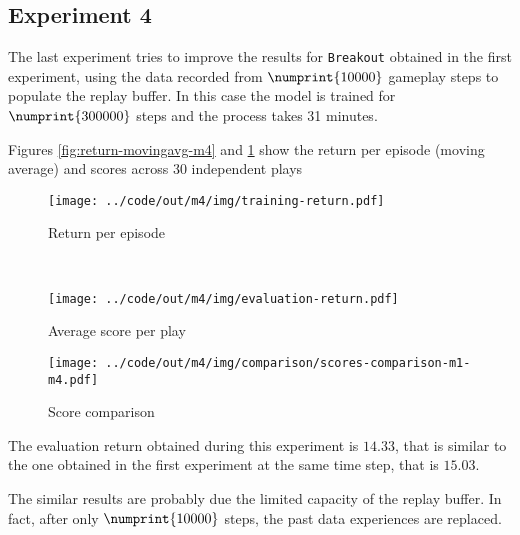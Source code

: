 \documentclass[a4paper,12pt]{article} %
\begin{document}
%	

	
	\subsection*{Experiment 4}
	The last experiment tries to improve the results for \texttt{Breakout} obtained in the first experiment, using the data recorded from $\numprint{10000}$ gameplay steps to populate the replay buffer.
	In this case the model is trained for $\numprint{300000}$ steps and the process takes 31 minutes.
	\bigskip

	Figures \ref{fig:return-movingavg-m4} and \ref{fig:score-m4} show the return per episode (moving average) and scores across 30 independent plays
	
	\begin{figure}[h]
		\begin{minipage}[b]{.49\textwidth}
			\centering
			\texttt{[image: ../code/out/m4/img/training-return.pdf]}	
			\caption{Return per episode}
			\label{fig:return-movingavg-m4}
		\end{minipage}
		~
		\begin{minipage}[b]{.49\textwidth}
			\centering
			\texttt{[image: ../code/out/m4/img/evaluation-return.pdf]}	
			\caption{Average score per play}
			\label{fig:score-m4}
		\end{minipage}
	\end{figure}

	\begin{figure}[htb]
		\centering
		\texttt{[image: ../code/out/m4/img/comparison/scores-comparison-m1-m4.pdf]}	
		\caption{Score comparison}
		\label{fig:score-m1-m4}
	\end{figure}
	
	The evaluation return obtained during this experiment is $14.33$, that is similar to the one obtained in the first experiment at the same time step, that is $15.03$.
	
	The similar results are probably due the limited capacity of the replay buffer. In fact, after only $\numprint{10000}$ steps, the past data experiences are replaced.
	
	
\end{document}
